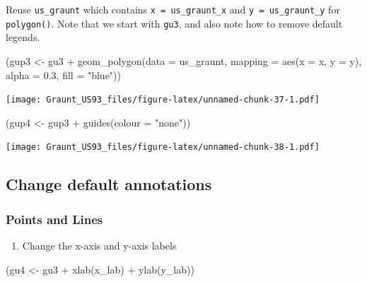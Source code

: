 \documentclass[
]{article}
\newenvironment{Shaded}{\begin{snugshade}}{\end{snugshade}}
\newcommand{\AttributeTok}[1]{\textcolor[rgb]{0.77,0.63,0.00}{#1}}
\newcommand{\FloatTok}[1]{\textcolor[rgb]{0.00,0.00,0.81}{#1}}
\newcommand{\FunctionTok}[1]{\textcolor[rgb]{0.00,0.00,0.00}{#1}}
\newcommand{\NormalTok}[1]{#1}
\newcommand{\OtherTok}[1]{\textcolor[rgb]{0.56,0.35,0.01}{#1}}
\newcommand{\SpecialCharTok}[1]{\textcolor[rgb]{0.00,0.00,0.00}{#1}}
\newcommand{\StringTok}[1]{\textcolor[rgb]{0.31,0.60,0.02}{#1}}
\providecommand{\tightlist}{%
  \setlength{\itemsep}{0pt}\setlength{\parskip}{0pt}}
\begin{document}
Reuse \texttt{us\_graunt} which contains \texttt{x\ =\ us\_graunt\_x}
and \texttt{y\ =\ us\_graunt\_y} for \texttt{polygon()}. Note that we
start with \texttt{gu3}, and also note how to remove default legends.

\begin{Shaded}
\begin{Highlighting}[]
\NormalTok{(gup3 }\OtherTok{\textless{}{-}}\NormalTok{ gu3 }\SpecialCharTok{+} 
  \FunctionTok{geom\_polygon}\NormalTok{(}\AttributeTok{data =}\NormalTok{ us\_graunt, }
               \AttributeTok{mapping =} \FunctionTok{aes}\NormalTok{(}\AttributeTok{x =}\NormalTok{ x, }\AttributeTok{y =}\NormalTok{ y), }
               \AttributeTok{alpha =} \FloatTok{0.3}\NormalTok{, }\AttributeTok{fill =} \StringTok{"blue"}\NormalTok{))}
\end{Highlighting}
\end{Shaded}

\texttt{[image: Graunt\_US93\_files/figure-latex/unnamed-chunk-37-1.pdf]}

\begin{Shaded}
\begin{Highlighting}[]
\NormalTok{(gup4 }\OtherTok{\textless{}{-}}\NormalTok{ gup3 }\SpecialCharTok{+} 
  \FunctionTok{guides}\NormalTok{(}\AttributeTok{colour =} \StringTok{"none"}\NormalTok{))}
\end{Highlighting}
\end{Shaded}

\texttt{[image: Graunt\_US93\_files/figure-latex/unnamed-chunk-38-1.pdf]}

\hypertarget{change-default-annotations}{%
\subsection{Change default
annotations}\label{change-default-annotations}}

\hypertarget{points-and-lines-1}{%
\subsubsection{Points and Lines}\label{points-and-lines-1}}

\begin{enumerate}
\def\labelenumi{\arabic{enumi}.}
\tightlist
\item
  Change the x-axis and y-axis labels
\end{enumerate}

\begin{Shaded}
\begin{Highlighting}[]
\NormalTok{(gu4 }\OtherTok{\textless{}{-}}\NormalTok{ gu3 }\SpecialCharTok{+} 
   \FunctionTok{xlab}\NormalTok{(x\_lab) }\SpecialCharTok{+} 
   \FunctionTok{ylab}\NormalTok{(y\_lab))}
\end{Highlighting}
\end{Shaded}
\end{document}
